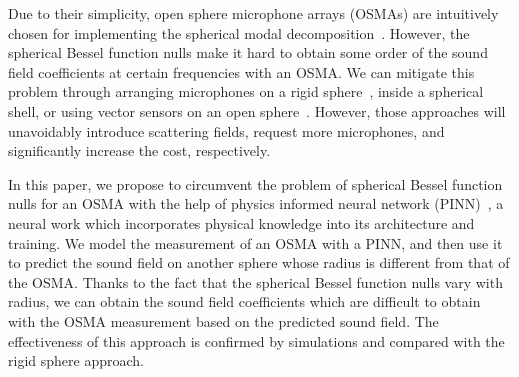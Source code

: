 \documentclass[11pt]{article}
\begin{document}
Due to their simplicity, open sphere microphone arrays 
(OSMAs) are intuitively chosen 
for implementing the spherical modal decomposition~\cite{5745011}.  
However, the spherical Bessel function nulls make it hard to obtain some order
of the sound field coefficients at certain frequencies with an OSMA.
We can mitigate this problem through arranging microphones 
on a rigid sphere~\cite{5744968}, inside a spherical shell, or using vector 
sensors on an open sphere~\cite{Rafaely2015,Ma2018,huang_flexible}. 
However, those approaches will unavoidably introduce scattering fields,  
request more microphones, and significantly increase the cost, respectively. 









In this paper, we propose to circumvent the problem of spherical Bessel function nulls 
for an OSMA with the help of physics informed neural network (PINN)~\cite{raissi2019physics,cuomo2022scientific,karniadakis2021physics}, a
neural work which incorporates physical knowledge into its architecture and training. 
We model the measurement of an OSMA with a PINN, and then use it to predict the sound 
field on another sphere whose radius is different from that of the OSMA.  
Thanks to the fact that the spherical Bessel function nulls vary with radius, we can 
obtain the sound field coefficients which are difficult to obtain with the OSMA 
measurement based on the predicted sound field.
The effectiveness of this approach is confirmed by simulations and compared with the rigid 
sphere approach. 
\end{document}
